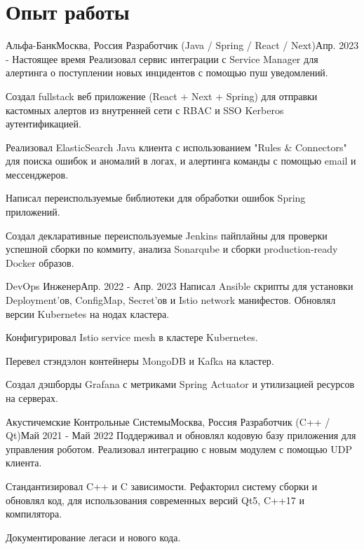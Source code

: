 

\section{Опыт работы}\label{sec:experience}
\resumeSubHeadingListStart

\resumeSubheading
{Альфа-Банк}{Москва, Россия}
    {Разработчик (Java / Spring / React / Next)}{Апр. 2023 - Настоящее время}
    \resumeItemListStart
        {Реализовал сервис интеграции с Service Manager для алертинга о поступлении новых инцидентов с помощью пуш уведомлений.}

        {Создал fullstack веб приложение (React + Next + Spring) для отправки кастомных алертов из внутренней сети с RBAC и SSO Kerberos аутентификацией.}

        {Реализовал ElasticSearch Java клиента с использованием "Rules \& Connectors" для поиска ошибок и аномалий в логах, и алертинга команды с помощью email и мессенджеров.}

        {Написал переиспользуемые библиотеки для обработки ошибок Spring приложений.}

        {Создал декларативные переиспользуемые Jenkins пайплайны для проверки успешной сборки по коммиту, анализа Sonarqube и сборки production-ready Docker образов.}
    \resumeItemListEnd

\resumeSubSubheading
{DevOps Инженер}{Апр. 2022 - Апр. 2023}
    \resumeItemListStart
        {Написал Ansible скрипты для установки Deployment'ов, ConfigMap, Secret'ов и Istio network манифестов. Обновлял версии Kubernetes на нодах кластера.}

        {Конфигурировал Istio service mesh в кластере Kubernetes.}

        {Перевел стэндэлон контейнеры MongoDB и Kafka на кластер.}

        {Создал дэшборды Grafana с метриками Spring Actuator и утилизацией ресурсов на серверах.}
    \resumeItemListEnd

\resumeSubheading
{Акустичемские Контрольные Системы}{Москва, Россия}
    {Разработчик (C++ / Qt)}{Май 2021 - Май 2022}
    \resumeItemListStart
        {Поддерживал и обновлял кодовую базу приложения для управления роботом. Реализовал интеграцию с новым модулем с помощью UDP клиента.}

        {Стандантизировал C++ и C зависимости. Рефакторил систему сборки и обновлял код, для использования современных версий Qt5, C++17 и компилятора.}

        {Документирование легаси и нового кода.}
    \resumeItemListEnd
\resumeSubHeadingListEnd